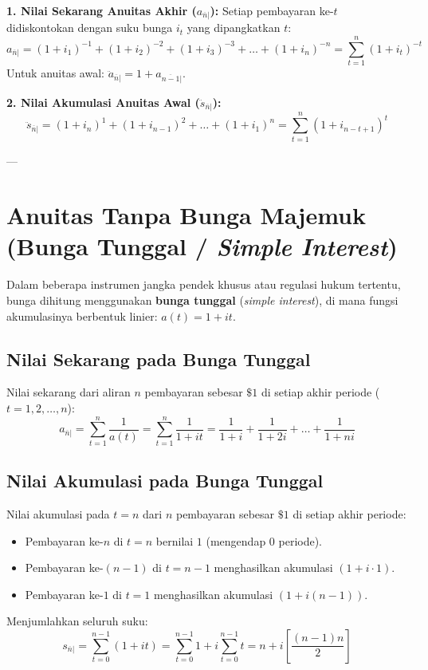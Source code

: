 \documentclass[11pt,a4paper]{article}
\begin{document}
\textbf{1. Nilai Sekarang Anuitas Akhir ($a_{\overline{n}|}$):}
Setiap pembayaran ke-$t$ didiskontokan dengan suku bunga $i_t$ yang dipangkatkan $t$:
\begin{equation}
    a_{\overline{n}|} = (1+i_1)^{-1} + (1+i_2)^{-2} + (1+i_3)^{-3} + \dots + (1+i_n)^{-n} = \sum_{t=1}^n (1+i_t)^{-t}
\end{equation}
Untuk anuitas awal: $\ddot{a}_{\overline{n}|} = 1 + a_{\overline{n-1}|}$.

\textbf{2. Nilai Akumulasi Anuitas Awal ($\ddot{s}_{\overline{n}|}$):}
\begin{equation}
    \ddot{s}_{\overline{n}|} = (1+i_n)^1 + (1+i_{n-1})^2 + \dots + (1+i_1)^n = \sum_{t=1}^n (1+i_{n-t+1})^t
\end{equation}

---

\section{Anuitas Tanpa Bunga Majemuk (Bunga Tunggal / \textit{Simple Interest})}

Dalam beberapa instrumen jangka pendek khusus atau regulasi hukum tertentu, bunga dihitung menggunakan \textbf{bunga tunggal} (\textit{simple interest}), di mana fungsi akumulasinya berbentuk linier: $a(t) = 1 + it$.

\subsection{Nilai Sekarang pada Bunga Tunggal}
Nilai sekarang dari aliran $n$ pembayaran sebesar $\$1$ di setiap akhir periode ($t = 1, 2, \dots, n$):
\begin{equation}
    a_{\overline{n}|} = \sum_{t=1}^n \frac{1}{a(t)} = \sum_{t=1}^n \frac{1}{1 + it} = \frac{1}{1+i} + \frac{1}{1+2i} + \dots + \frac{1}{1+ni}
\end{equation}

\subsection{Nilai Akumulasi pada Bunga Tunggal}
Nilai akumulasi pada $t = n$ dari $n$ pembayaran sebesar $\$1$ di setiap akhir periode:
\begin{itemize}
    \item Pembayaran ke-$n$ di $t = n$ bernilai $1$ (mengendap 0 periode).
    \item Pembayaran ke-$(n-1)$ di $t = n-1$ menghasilkan akumulasi $(1 + i \cdot 1)$.
    \item Pembayaran ke-$1$ di $t = 1$ menghasilkan akumulasi $(1 + i(n-1))$.
\end{itemize}
Menjumlahkan seluruh suku:
\begin{equation}
    s_{\overline{n}|} = \sum_{t=0}^{n-1} (1 + it) = \sum_{t=0}^{n-1} 1 + i \sum_{t=0}^{n-1} t = n + i \left[ \frac{(n-1)n}{2} \right]
\end{equation}
\end{document}
